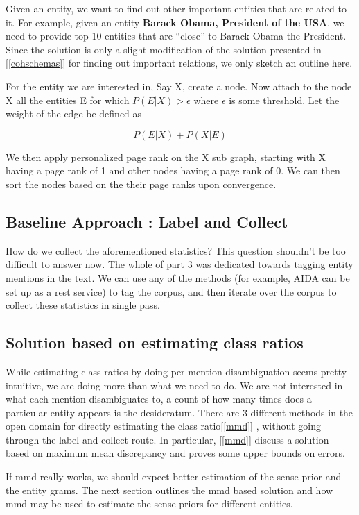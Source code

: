  Given an entity, we want to find out other important entities that are related to it.
 For example, given an entity \textbf{Barack Obama, President of the USA}, we need to provide top 10 entities that are
 ``close'' to Barack Obama the President. Since the solution is only a slight modification of the solution 
 presented in [\ref{cohschemas}] for finding out important relations, we only sketch an outline here. 
 
For the entity we are interested in, Say X, create a node. Now attach to the node X all the entities E for which
$P(E|X) >  \epsilon$ where $\epsilon$ is some threshold. Let the weight of the edge be defined as

\begin{equation}
\tag{3}
 P(E|X) + P(X|E) 
\end{equation}

We then apply personalized page rank on the X sub graph, starting with X having a 
page rank of 1 and other nodes having a page rank of 0. We can then sort the nodes
based on the their page ranks upon convergence. 
 


\subsection{Baseline Approach : Label and Collect}
How do we collect the aforementioned statistics?
This question shouldn't be too difficult to answer now. The whole of part 3
was dedicated towards tagging entity mentions in the text. We can use any of the 
methods (for example, AIDA can be set up as a rest service) to tag the corpus, and then iterate over the corpus to collect these statistics
in single pass. 
\subsection{Solution based on estimating class ratios}
While estimating class ratios by doing per mention disambiguation seems pretty intuitive, we are doing more than what we need to do.
We are not interested in what each mention disambiguates to, a count of how many times does a particular entity appears
is the desideratum. There are 3 different methods in the open domain for directly estimating the class ratio[\ref{mmd}] 
, without going through the label and collect route. In particular, [\ref{mmd}] discuss a solution based on maximum mean 
discrepancy and proves some upper bounds on errors. 

If mmd really works, we should expect better estimation of the sense prior and the entity grams. The next section outlines the mmd based 
solution and how mmd may be used to estimate the sense priors for different entities. 

